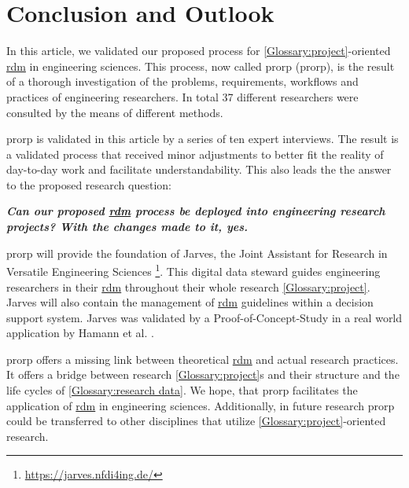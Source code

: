 \documentclass{bausteinefdm}
\begin{document}
\section{Conclusion and Outlook}
\label{Conclusion and Outlook}



In this article, we validated our proposed process for \ref{Glossary:project}-oriented \hyperref[Glossary:research data management level]{\ac{rdm}} in engineering sciences.
This process, now called \acl{prorp} (\ac{prorp}), is the result of a thorough investigation of the problems, requirements, workflows and practices of engineering researchers.
In total 37 different researchers were consulted by the means of different methods.

\ac{prorp} is validated in this article by a series of ten expert interviews.
The result is a validated process that received minor adjustments to better fit the reality of day-to-day work and facilitate understandability.
This also leads the the answer to the proposed research question:

\hfill\begin{minipage}{\dimexpr\textwidth-0.5cm}
    \textit{
        \textbf{
            Can our proposed \hyperref[Glossary:research data management level]{\ac{rdm}} process be deployed into engineering research projects?
            \newline
            With the changes made to it, yes.
        }
    }
\end{minipage}


\ac{prorp} will provide the foundation of Jarves, the Joint Assistant for Research in Versatile Engineering Sciences \footnote{\url{https://jarves.nfdi4ing.de/}}. 
This digital data steward guides engineering researchers in their \hyperref[Glossary:research data management level]{\ac{rdm}} throughout their whole research \ref{Glossary:project}. 
Jarves will also contain the management of \hyperref[Glossary:research data management level]{\ac{rdm}} guidelines within a decision support system.
\cite{Hamann.2024b} %
Jarves was validated by a Proof-of-Concept-Study in a real world application by Hamann et al. \cite{Hamann.2025b}.

\ac{prorp} offers a missing link between theoretical \hyperref[Glossary:research data management level]{\ac{rdm}} and actual research practices.
It offers a bridge between research \ref{Glossary:project}s and their structure and the life cycles of \ref{Glossary:research data}.
We hope, that \ac{prorp} facilitates the application of \hyperref[Glossary:research data management level]{\ac{rdm}} in engineering sciences.
Additionally, in future research \ac{prorp} could be transferred to other disciplines that utilize \ref{Glossary:project}-oriented research.
\end{document}
